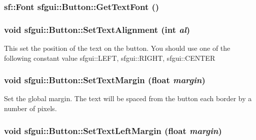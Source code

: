 \hypertarget{classsfgui_1_1Button_8b3a0a7ac0482c039e11bb615a55e86b}{
\subsubsection[GetTextFont]{\setlength{\rightskip}{0pt plus 5cm}sf::Font sfgui::Button::GetTextFont ()}}
\label{classsfgui_1_1Button_8b3a0a7ac0482c039e11bb615a55e86b}


\hypertarget{classsfgui_1_1Button_c1c0fe577ad7bfa1367ad406ae087bd1}{
\subsubsection[SetTextAlignment]{\setlength{\rightskip}{0pt plus 5cm}void sfgui::Button::SetTextAlignment (int {\em al})}}
\label{classsfgui_1_1Button_c1c0fe577ad7bfa1367ad406ae087bd1}




This set the position of the text on the button. You should use one of the following constant value sfgui::LEFT, sfgui::RIGHT, sfgui::CENTER \hypertarget{classsfgui_1_1Button_af84ec76e02e12c55667b960d80cc90b}{
\subsubsection[SetTextMargin]{\setlength{\rightskip}{0pt plus 5cm}void sfgui::Button::SetTextMargin (float {\em margin})}}
\label{classsfgui_1_1Button_af84ec76e02e12c55667b960d80cc90b}




Set the global margin. The text will be spaced from the button each border by a number of pixels. \hypertarget{classsfgui_1_1Button_94b8976462b04b1a0e63542dd49aa7c8}{
\subsubsection[SetTextLeftMargin]{\setlength{\rightskip}{0pt plus 5cm}void sfgui::Button::SetTextLeftMargin (float {\em margin})}}
\label{classsfgui_1_1Button_94b8976462b04b1a0e63542dd49aa7c8}




